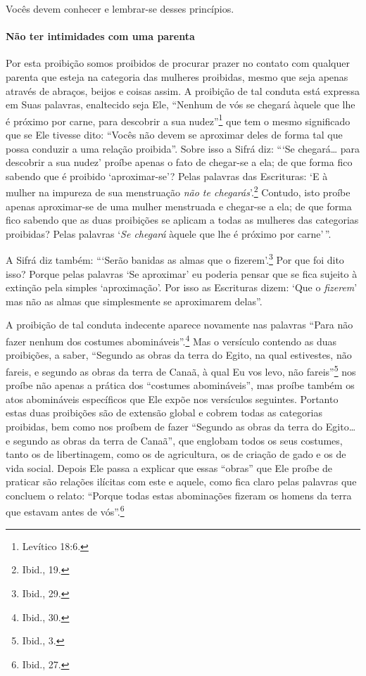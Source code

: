 Vocês devem conhecer e lembrar-se desses princípios.

\paragraph{Não ter intimidades com uma parenta}

Por esta proibição somos proibidos de procurar prazer no contato com
qualquer parenta que esteja na categoria das mulheres proibidas, mesmo
que seja apenas através de abraços, beijos e coisas assim. A proibição
de tal conduta está expressa em Suas palavras, enaltecido seja Ele,
``Nenhum de vós se chegará àquele que lhe é próximo por carne, para
descobrir a sua nudez''\footnote{Levítico 18:6.} que tem o mesmo significado que
se Ele tivesse dito: ``Vocês não devem se aproximar deles de forma tal
que possa conduzir a uma relação proibida''. Sobre isso a Sifrá diz:
```Se chegará\ldots{} para descobrir a sua nudez' proíbe apenas o fato de
chegar-se a ela; de que forma fico sabendo que é proibido
`aproximar-se'? Pelas palavras das Escrituras: `E à mulher na impureza
de sua menstruação \emph{não te chegarás}'.\footnote{Ibid., 19.} Contudo, isto
proíbe apenas aproximar-se de uma mulher menstruada e chegar-se a ela;
de que forma fico sabendo que as duas proibições se aplicam a todas as
mulheres das categorias proibidas? Pelas palavras `\emph{Se chegará}
àquele que lhe é próximo por carne'\,''.

A Sifrá diz também: ```Serão banidas as almas que o fizerem'.\footnote{Ibid.,
29.} Por que foi dito isso? Porque pelas palavras `Se aproximar' eu
poderia pensar que se fica sujeito à extinção pela simples
`aproximação'. Por isso as Escrituras dizem: `Que o \emph{fizerem}' mas
não as almas que simplesmente se aproximarem delas''.

A proibição de tal conduta indecente aparece novamente nas palavras
``Para não fazer nenhum dos costumes abomináveis''.\footnote{Ibid., 30.} Mas o
versículo contendo as duas proibições, a saber, ``Segundo as obras da
terra do Egito, na qual estivestes, não fareis, e segundo as obras da
terra de Canaã, à qual Eu vos levo, não fareis''\footnote{Ibid., 3.} nos proíbe
não apenas a prática dos ``costumes abomináveis'', mas proíbe também os
atos abomináveis específicos que Ele expõe nos versículos seguintes.
Portanto estas duas proibições são de extensão global e cobrem todas as
categorias proibidas, bem como nos proíbem de fazer ``Segundo as obras
da terra do Egito\ldots{} e segundo as obras da terra de Canaã'', que
englobam todos os seus costumes, tanto os de libertinagem, como os de
agricultura, os de criação de gado e os de vida social. Depois Ele
passa a explicar que essas ``obras'' que Ele proíbe de praticar são
relações ilícitas com este e aquele, como fica claro pelas palavras que
concluem o relato: ``Porque todas estas abominações fizeram os homens da
terra que estavam antes de vós''.\footnote{Ibid., 27.}

